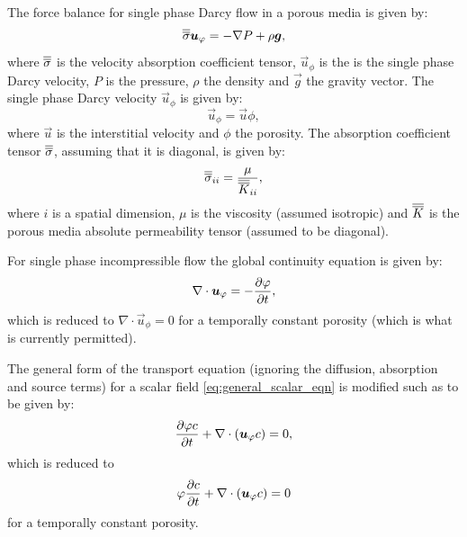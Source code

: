 The force balance for single phase Darcy flow in a porous media is given by:
\begin{equation}
   \label{eq:mom_press_single_phase_darcy}
   \overline{\overline{\sigma}} {\mbox{\boldmath$u$}}_{\varphi} = 
   - \nabla P + \rho {\mbox{\boldmath$g$}},
\end{equation}
where $\overline{\overline{\sigma}}$ is the velocity absorption coefficient tensor, $\vec{u}_{\phi}$ is the is the single phase Darcy velocity, $P$ is the pressure, $\rho$ the density and $\vec{g}$ the gravity vector. The single phase Darcy velocity $\vec{u}_{\phi}$ is given by:
\begin{equation}
   \vec{u}_{\phi} = \vec{u} \phi,
\end{equation}
where $\vec{u}$ is the interstitial velocity and $\phi$ the porosity. The absorption coefficient tensor $\overline{\overline{\sigma}}$, assuming that it is diagonal, is given by:
\begin{equation}
   \label{eq:single_phase_darcy_velocity_abs}
   \overline{\overline{\sigma}}_{ii} = \frac{ \mu } { \overline{\overline{K}}_{ii} },
\end{equation}
where $i$ is a spatial dimension, $\mu$ is the viscosity (assumed isotropic) and $\overline{\overline{K}}$ is the porous media absolute permeability tensor (assumed to be diagonal).

For single phase incompressible flow the global continuity equation is given by:
\begin{equation} 
   \label{eq:cty_single_phase_darcy}
   \nabla\cdot {\mbox{\boldmath$u$}}_{\varphi} = - \frac{\partial\varphi}{\partial t},
\end{equation}
which is reduced to $\nabla\cdot \vec{u}_{\phi} = 0$ for a temporally constant porosity (which is what is currently permitted).

The general form of the transport equation (ignoring the diffusion, absorption and source terms) for a scalar field \eqref{eq:general_scalar_eqn} is modified such as to be given by:
\begin{equation}
   \label{eq:general_scalar_eqn_single_phase_darcy}
   \frac{\partial\varphi c}{\partial t} + \nabla\cdot({\mbox{\boldmath$u$}}_{\varphi} c) = 0,
\end{equation}
which is reduced to
\begin{equation}
   \varphi \frac{\partial c}{\partial t} + \nabla\cdot({\mbox{\boldmath$u$}}_{\varphi} c) = 0
\end{equation}
for a temporally constant porosity.
